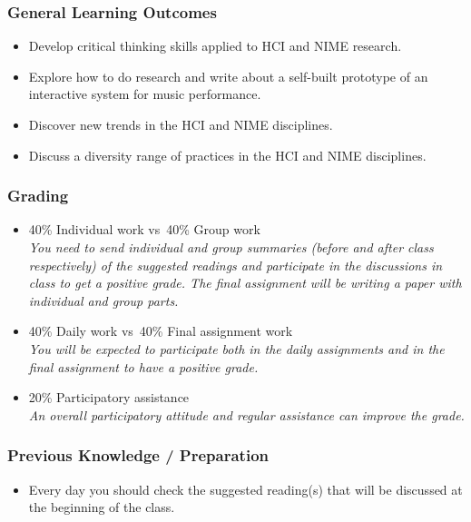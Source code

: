 \documentclass[screen, aspectratio=169]{beamer}
\begin{document}
%
\begin{frame}
\frametitle{General Learning Outcomes}
\begin{itemize}
\item Develop critical thinking skills applied to HCI and NIME research.
\item Explore how to do research and write about a self-built prototype of an interactive system for music performance.
\item Discover new trends in the HCI and NIME disciplines.
\item Discuss a diversity range of practices in the HCI and NIME disciplines.
\end{itemize}
\end{frame}
%
\begin{frame}
\frametitle{Grading}
\begin{itemize}
\item 40\% Individual work vs\ 40\% Group work\\
\emph{You need to send individual and group summaries (before and after class respectively) of the suggested readings and participate in the discussions in class to get a positive grade. The final assignment will be writing a paper with individual and group parts.}
\item 40\% Daily work vs\ 40\% Final assignment work\\
\emph{You will be expected to participate both in the daily assignments and in the final assignment to have a positive grade.}
\item 20\% Participatory assistance\\
\emph{An overall participatory attitude and regular assistance can improve the grade.}
\end{itemize}
\end{frame}
%
\begin{frame}
\frametitle{Previous Knowledge / Preparation}
\begin{itemize}
\item Every day you should check the suggested reading(s) that will be discussed at the beginning of the class.
\end{itemize}
\end{frame}
%
\end{document}
